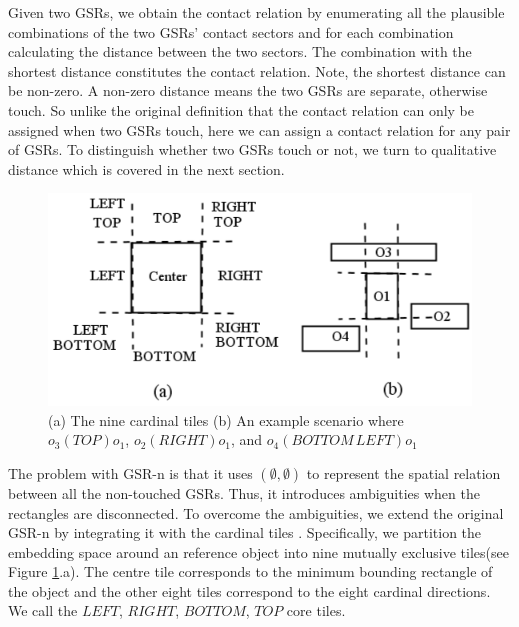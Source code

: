 \documentclass[letterpaper]{article}
\begin{document}
Given two GSRs, we obtain the contact relation by enumerating all the plausible combinations of the two GSRs' contact sectors and for each combination calculating the distance between the two sectors. The combination with the shortest distance constitutes the contact relation. Note, the shortest distance can be non-zero. A non-zero distance means the two GSRs are separate, otherwise touch. So unlike the original definition that the contact relation can only be assigned when two GSRs touch, here we can assign a contact relation for any pair of GSRs. To distinguish whether two GSRs touch or not, we turn to qualitative distance which is covered in the next section.
\begin{figure}[h!]
\centering\includegraphics[scale=0.35]{CardinalTiles.png}\caption{(a) The nine cardinal tiles (b) An example scenario where $o_3 (TOP) o_1$, $o_2 (RIGHT) o_1$, and $o_4 (BOTTOM\,LEFT) o_1$}
\label{CardinalTile}
\end{figure}
The problem with GSR-n is that it uses $(\emptyset, \emptyset)$ to represent the spatial relation between all the non-touched GSRs. Thus, it introduces ambiguities when the rectangles are disconnected. To overcome the ambiguities, we extend the original GSR-n by integrating it with the cardinal tiles \cite{goyal1997direction}. Specifically, we partition the embedding space around an reference object into nine mutually exclusive tiles(see Figure \ref{CardinalTile}.a). The centre tile corresponds to the minimum bounding rectangle of the object and the other eight tiles correspond to the eight cardinal directions. We call the $LEFT$, $RIGHT$, $BOTTOM$, $TOP$ core tiles.  
\end{document}
